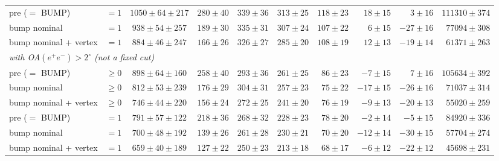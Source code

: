 \begin{table}[H]
\begin{tabular}{llcrrrrrrr}
\addlinespace
pre ($=$ BUMP) & $=1$ & $1050\pm64\pm217$ & $280\pm40$ & $339\pm36$ & $313\pm25$ & $118\pm23$ & $18\pm15$ & $3\pm16$ & $111310\pm374$ \\
bump nominal & $=1$ & $938\pm54\pm257$ & $189\pm30$ & $335\pm31$ & $307\pm24$ & $107\pm22$ & $6\pm15$ & $-27\pm16$ & $77094\pm308$ \\
bump nominal + vertex & $=1$ & $884\pm46\pm247$ & $166\pm26$ & $326\pm27$ & $285\pm20$ & $108\pm19$ & $12\pm13$ & $-19\pm14$ & $61371\pm263$ \\
\midrule
\multicolumn{10}{l}{\emph{with OA$(e^+e^-)>2^\circ$ (not a fixed cut)}} \\
pre ($=$ BUMP) & $\geq0$ & $898\pm64\pm160$ & $258\pm40$ & $293\pm36$ & $261\pm25$ & $86\pm23$ & $-7\pm15$ & $7\pm16$ & $105634\pm392$ \\
bump nominal & $\geq0$ & $812\pm53\pm239$ & $176\pm29$ & $304\pm31$ & $257\pm23$ & $75\pm22$ & $-17\pm15$ & $-26\pm16$ & $71037\pm314$ \\
bump nominal + vertex & $\geq0$ & $746\pm44\pm220$ & $156\pm24$ & $272\pm25$ & $241\pm20$ & $76\pm19$ & $-9\pm13$ & $-20\pm13$ & $55020\pm259$ \\
\addlinespace
pre ($=$ BUMP) & $=1$ & $791\pm57\pm122$ & $218\pm36$ & $268\pm32$ & $228\pm23$ & $78\pm20$ & $-2\pm14$ & $-5\pm15$ & $84920\pm336$ \\
bump nominal & $=1$ & $700\pm48\pm192$ & $139\pm26$ & $261\pm28$ & $230\pm21$ & $70\pm20$ & $-12\pm14$ & $-30\pm15$ & $57704\pm274$ \\
bump nominal + vertex & $=1$ & $659\pm40\pm189$ & $127\pm22$ & $250\pm23$ & $213\pm18$ & $68\pm17$ & $-6\pm12$ & $-22\pm12$ & $45698\pm231$ \\
\bottomrule
\end{tabular}
\end{table}

